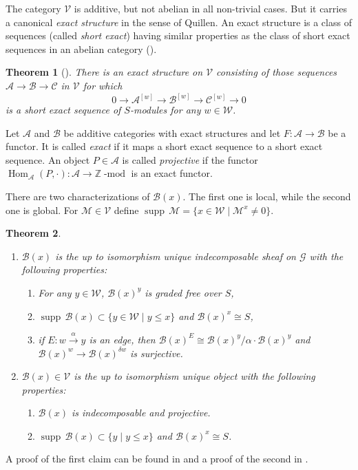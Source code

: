 \documentclass[12pt]{amsart}
\newtheorem{theorem}{Theorem}[section]
\theoremstyle{definition}
\theoremstyle{remark}
\newcommand{\CA}{{\mathcal A}}
\newcommand{\CB}{{\mathcal B}}
\newcommand{\CG}{{\mathcal G}}
\newcommand{\CV}{{\mathcal V}}
\newcommand{\CW}{{\mathcal W}}
\newcommand{\SA}{{\mathscr A}}
\newcommand{\SB}{{\mathscr B}}
\newcommand{\SC}{{\mathscr C}}
\newcommand{\SM}{{\mathscr M}}
\newcommand{\DZ}{{\mathbb Z}}
\newcommand{\Hom}{{\operatorname{Hom}}}
\newcommand{\supp}{{\operatorname{supp}\,}}
\newcommand{\catmod}{{\operatorname{-mod}}}
\begin{document}
The category $\CV$ is additive, but not abelian in all non-trivial cases. But it carries a canonical {\em exact structure} in the sense of Quillen. An exact structure is a class of sequences (called {\em short exact}) having similar properties as the class of short exact sequences in an abelian category (\cite{Qu}).

\begin{theorem}[\cite{Fie1}] There is an exact structure on $\CV$ consisting of those sequences $\SA\to\SB\to\SC$ in $\CV$ for which
$$
0\to\SA^{[w]}\to\SB^{[w]}\to\SC^{[w]}\to0
$$
is a short exact sequence of $S$-modules for any $w\in\CW$.
\end{theorem}

Let $\CA$ and $\CB$ be additive categories with exact structures and let $F\colon\CA\to\CB$ be a functor. It is called {\em exact} if it maps a short exact sequence to a short exact sequence. An object $P\in\CA$ is called {\em projective} if the functor $\Hom_{\CA}(P,\cdot)\colon\CA\to\DZ\catmod$ is an exact functor.


There are two characterizations of $\SB(x)$. The first one is local, while the second one is global. For $\SM\in\CV$ define $\supp\SM=\{x\in\CW\mid\SM^x\neq 0\}$. 
\begin{theorem}\begin{enumerate}
\item  $\SB(x)$ is the up to isomorphism unique indecomposable sheaf on $\CG$ with the following properties:
\begin{enumerate} 
\item For any $y\in\CW$, $\SB(x)^y$ is graded free over $S$,
\item $\supp\SB(x)\subset\{y\in\CW\mid y\leq x\}$ and $\SB(x)^x\cong S$, 
\item if $E\colon w\stackrel{\alpha}\to y$ is an edge, then $\SB(x)^E\cong\SB(x)^y/\alpha\cdot\SB(x)^y$ and $\SB(x)^w\to \SB(x)^{\delta w}$ is surjective.
\end{enumerate}
\item $\SB(x)\in\CV$ is the up to isomorphism unique object with the following properties:
\begin{enumerate}
\item $\SB(x)$ is indecomposable and projective.
\item $\supp\SB(x)\subset\{y\mid y\leq x\}$ and $\SB(x)^x\cong S$. 
\end{enumerate}
\end{enumerate}
\end{theorem}
A proof of the first claim can be found in  \cite{BMP} and a proof of the second in \cite{Fie1}.
\end{document}
